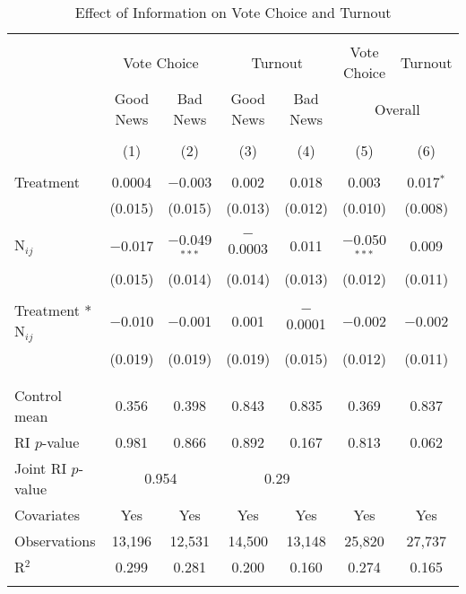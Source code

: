 \documentclass[]{article}
\begin{document}
\begin{table}[!htbp] \centering 
  \caption{Effect of Information on Vote Choice and Turnout} 
  \label{main_results} 
\begin{tabular}{@{\extracolsep{1pt}}lcccccc} 
\\[-1.8ex]\hline 
\hline \\[-1.8ex] 
 & \multicolumn{2}{c}{Vote Choice}&\multicolumn{2}{c}{Turnout}& Vote Choice & Turnout \\ 
\cline{2-7} 
 & Good News & Bad News & Good News & Bad News & \multicolumn{2}{c}{Overall} \\ 
\\[-1.8ex] & (1) & (2) & (3) & (4) & (5) & (6)\\ 
\hline \\[-1.8ex] 
 Treatment & 0.0004 & $-$0.003 & 0.002 & 0.018 & 0.003 & 0.017$^{*}$ \\ 
  & (0.015) & (0.015) & (0.013) & (0.012) & (0.010) & (0.008) \\ 
  & & & & & & \\ 
 N$_{ij}$ & $-$0.017 & $-$0.049$^{***}$ & $-$0.0003 & 0.011 & $-$0.050$^{***}$ & 0.009 \\ 
  & (0.015) & (0.014) & (0.014) & (0.013) & (0.012) & (0.011) \\ 
  & & & & & & \\ 
 Treatment * N$_{ij}$ & $-$0.010 & $-$0.001 & 0.001 & $-$0.0001 & $-$0.002 & $-$0.002 \\ 
  & (0.019) & (0.019) & (0.019) & (0.015) & (0.012) & (0.011) \\ 
  & & & & & & \\ 
\hline \\[-1.8ex] 
Control mean & 0.356 & 0.398 & 0.843 & 0.835 & 0.369 & 0.837 \\ 
RI $p$-value & 0.981 & 0.866 & 0.892 & 0.167 & 0.813 & 0.062 \\ 
Joint RI $p$-value & \multicolumn{2}{c}{0.954} & \multicolumn{2}{c}{0.29} \\
Covariates & Yes & Yes & Yes & Yes & Yes & Yes \\ 
Observations & 13,196 & 12,531 & 14,500 & 13,148 & 25,820 & 27,737 \\ 
R$^{2}$ & 0.299 & 0.281 & 0.200 & 0.160 & 0.274 & 0.165 \\ 
\hline 
\hline \\[-1.8ex] 
\end{tabular} 

\end{table}
\end{document}
